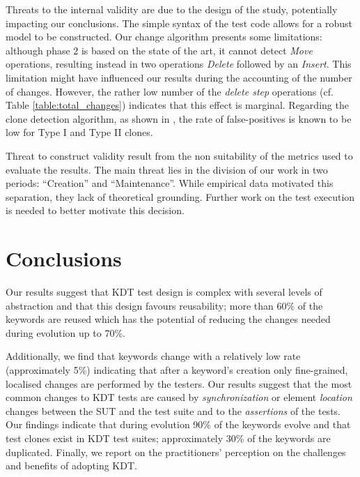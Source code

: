 Threats to the internal validity are due to the design of the study, potentially impacting our conclusions. The simple syntax of the test code allows for a robust model to be constructed. Our change algorithm presents some limitations: although phase 2 is based on the state of the art, it cannot detect \emph{Move} operations, resulting instead in two operations \emph{Delete} followed by an \emph{Insert}. This limitation might have influenced our results during the accounting of the number of changes. However, the rather low number of the \emph{delete step} operations (cf. Table \ref{table:total_changes}) indicates that this effect is marginal. Regarding the clone detection algorithm, as shown in \cite{Roy2009}, the rate of false-positives is known to be low for Type I and Type II clones.

Threat to construct validity result from the non suitability of the metrics used to evaluate the results. The main threat lies in the division of our work in two periods: ``Creation'' and ``Maintenance''. While empirical data motivated this separation, they lack of theoretical grounding. Further work on the test execution is needed to better motivate this decision.

\section{Conclusions}

Our results suggest that KDT test design is complex with several levels of abstraction and that this design favours reusability; more than 60\% of the keywords are reused which has the potential of reducing the changes needed during evolution up to 70\%.

Additionally, we find that keywords change with a relatively low rate (approximately 5\%) indicating that after a keyword's creation only fine-grained, localised changes are performed by the testers. Our results suggest that the most common changes to KDT tests are caused by \emph{synchronization} or element \emph{location} changes between the SUT and the test suite and to the \emph{assertions} of the tests. Our findings indicate that during evolution 90\% of the keywords evolve and that test clones exist in KDT test suites; approximately 30\% of the keywords are duplicated. Finally, we report on the practitioners' perception on the challenges and benefits of adopting KDT.